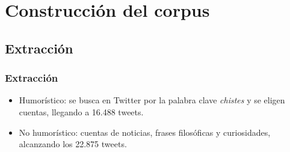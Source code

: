 \section{Construcción del corpus}

\subsection{Extracción}
\begin{frame}
    \frametitle{Extracción}

    \begin{itemize}
        \item Humorístico: se busca en Twitter por la palabra clave \emph{chistes} y se eligen cuentas, llegando a 16.488 tweets.
        \item No humorístico: cuentas de noticias, frases filosóficas y curiosidades, alcanzando los 22.875 tweets.
    \end{itemize}
\end{frame}


